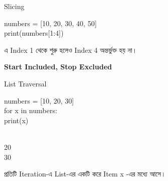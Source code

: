 \begin{codeoutputbox}{Slicing}

\noindent
\begin{minipage}[t]{0.53\linewidth}
\codeheading

\begin{english}
\ttfamily
numbers = [10, 20, 30, 40, 50]\\
print(numbers[1:4])
\end{english}

\end{minipage}
\hfill
\begin{minipage}[t]{0.43\linewidth}
\outputheading

\begin{center}
\textenglish{\ttfamily [20, 30, 40]}
\end{center}

\textenglish{\ttfamily [1:4]}
এ Index 1 থেকে শুরু হলেও Index 4 অন্তর্ভুক্ত হয় না।

\medskip

\textbf{Start Included, Stop Excluded}

\end{minipage}

\end{codeoutputbox}



\begin{codeoutputbox}{List Traversal}

\noindent
\begin{minipage}[t]{0.53\linewidth}
\codeheading

\begin{english}
\ttfamily
numbers = [10, 20, 30]\\
for x in numbers:\\
\hspace*{4mm}print(x)
\end{english}

\end{minipage}
\hfill
\begin{minipage}[t]{0.43\linewidth}
\outputheading

\begin{english}
\\
20\\
30
\end{english}

\medskip

প্রতিটি Iteration-এ List-এর একটি করে Item
\textenglish{\ttfamily x}
-এর মধ্যে আসে।

\end{minipage}

\end{codeoutputbox}

